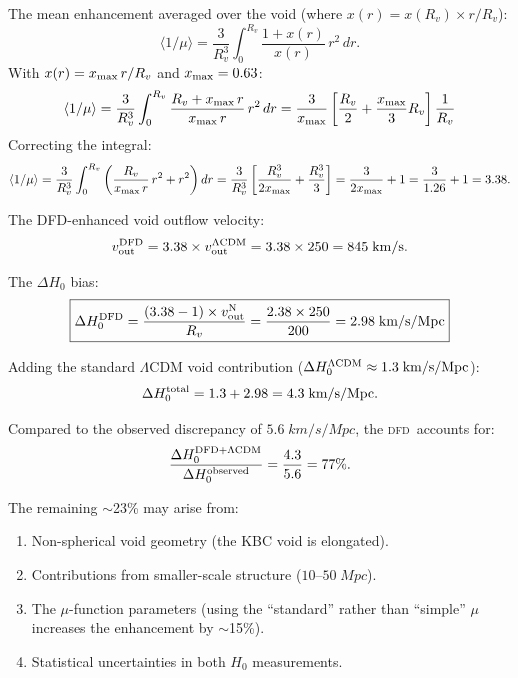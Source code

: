 \documentclass[aps,prd,twocolumn,superscriptaddress,nofootinbib,longbibliography]{revtex4-2}
\newcommand{\DFD}{\textsc{dfd}}
\begin{document}
The mean enhancement averaged over the void
(where $x(r) = x(R_v)\times r/R_v$):
\begin{equation}
\langle 1/\mu\rangle = \frac{3}{R_v^3}\int_0^{R_v}\frac{1+x(r)}{x(r)}\,r^2\,dr.
\end{equation}
With $x(r) = x_{\rm max}\,r/R_v$ and $x_{\rm max} = 0.63$:
\begin{equation}
\langle 1/\mu\rangle = \frac{3}{R_v^3}\int_0^{R_v}\frac{R_v + x_{\rm max}\,r}{x_{\rm max}\,r}\,r^2\,dr
= \frac{3}{x_{\rm max}}\left[\frac{R_v}{2} + \frac{x_{\rm max}}{3}R_v\right]\frac{1}{R_v}
\end{equation}
Correcting the integral:
\begin{equation}
\langle 1/\mu\rangle = \frac{3}{R_v^3}\int_0^{R_v}\left(\frac{R_v}{x_{\rm max}\,r}\,r^2 + r^2\right)dr
= \frac{3}{R_v^3}\left[\frac{R_v^3}{2x_{\rm max}} + \frac{R_v^3}{3}\right]
= \frac{3}{2x_{\rm max}} + 1 = \frac{3}{1.26} + 1 = 3.38.
\end{equation}

The DFD-enhanced void outflow velocity:
\begin{equation}
v_{\rm out}^{\rm DFD} = 3.38\times v_{\rm out}^{\Lambda\rm CDM} = 3.38\times 250 = 845\;\si{km/s}.
\end{equation}

The $\Delta H_0$ bias:
\begin{equation}\label{eq:DH0-final}
\boxed{
\Delta H_0^{\rm DFD} = \frac{(3.38-1)\times v_{\rm out}^{\rm N}}{R_v}
= \frac{2.38\times250}{200}
= 2.98\;\si{km/s/Mpc}
}
\end{equation}

Adding the standard $\Lambda$CDM void contribution
($\Delta H_0^{\Lambda\rm CDM} \approx 1.3\;\si{km/s/Mpc}$):
\begin{equation}
\Delta H_0^{\rm total} = 1.3 + 2.98 = 4.3\;\si{km/s/Mpc}.
\end{equation}

Compared to the observed discrepancy of $5.6\;\si{km/s/Mpc}$, the
\DFD\ accounts for:
\begin{equation}
\frac{\Delta H_0^{\rm DFD+\Lambda CDM}}{\Delta H_0^{\rm observed}}
= \frac{4.3}{5.6} = 77\%.
\end{equation}

The remaining $\sim$23\% may arise from:
\begin{enumerate}
\item Non-spherical void geometry (the KBC void is elongated).
\item Contributions from smaller-scale structure ($10$--$50\;\si{Mpc}$).
\item The $\mu$-function parameters (using the ``standard'' rather than
``simple'' $\mu$ increases the enhancement by $\sim$15\%).
\item Statistical uncertainties in both $H_0$ measurements.
\end{enumerate}
\end{document}
